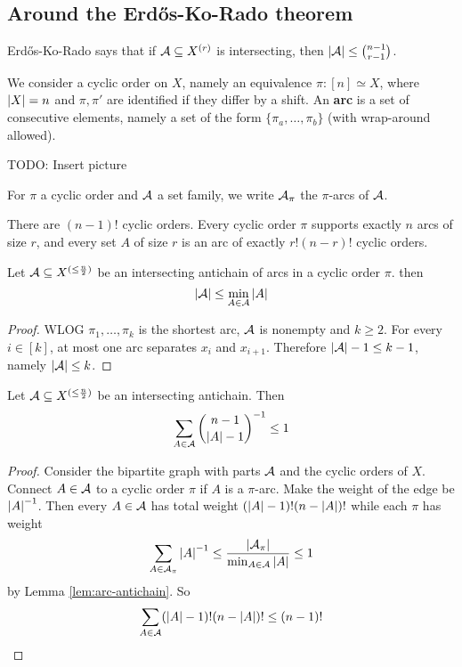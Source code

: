 \documentclass{article}
\begin{document}
\clearpage

\subsection{Around the Erd\H os-Ko-Rado theorem}

Erd\H os-Ko-Rado says that if $\mathcal A \subseteq X^{(r)}$ is intersecting, then $\left\lvert \mathcal A\right\rvert \le \binom{n - 1}{r - 1}$.

\newlec

\begin{defi}
  We consider a cyclic order on $X$, namely an equivalence $\pi : [n] \simeq X$, where $\left\lvert X\right\rvert = n$ and $\pi, \pi'$ are identified if they differ by a shift. An {\bf arc} is a set of consecutive elements, namely a set of the form $\{\pi_a, \dots, \pi_b\}$ (with wrap-around allowed).
  
  TODO: Insert picture
  
  For $\pi$ a cyclic order and $\mathcal A$ a set family, we write $\mathcal A_\pi$ the $\pi$-arcs of $\mathcal A$.

  There are $(n - 1)!$ cyclic orders. Every cyclic order $\pi$ supports exactly $n$ arcs of size $r$, and every set $A$ of size $r$ is an arc of exactly $r!(n - r)!$ cyclic orders.
\end{defi}

\begin{nlemma}\label{lem:arc-antichain}
  Let $\mathcal A \subseteq X^{(\le \frac n2)}$ be an intersecting antichain of arcs in a cyclic order $\pi$. then
  $$\left\lvert \mathcal A\right\rvert \le \min_{A \in \mathcal A} \left\lvert A\right\rvert$$
\end{nlemma}
\begin{proof}
  WLOG $\pi_1, \dots, \pi_k$ is the shortest arc, $\mathcal A$ is nonempty and $k \ge 2$. For every $i \in [k]$, at most one arc separates $x_i$ and $x_{i + 1}$. Therefore $\left\lvert \mathcal A\right\rvert - 1 \le k - 1$, namely $\left\lvert \mathcal A\right\rvert \le k$.
\end{proof}

\begin{nthm}
  Let $\mathcal A \subseteq X^{(\le \frac n2)}$ be an intersecting antichain. Then
  $$\sum_{A \in \mathcal A} \binom{n - 1}{\left\lvert A\right\rvert - 1}^{-1} \le 1$$
\end{nthm}
\begin{proof}
  Consider the bipartite graph with parts $\mathcal A$ and the cyclic orders of $X$. Connect $A \in \mathcal A$ to a cyclic order $\pi$ if $A$ is a $\pi$-arc. Make the weight of the edge be $\left\lvert A\right\rvert^{-1}$. Then every $A \in \mathcal A$ has total weight $(\left\lvert A\right\rvert - 1)!(n - \left\lvert A\right\rvert)!$ while each $\pi$ has weight
  $$\sum_{A \in \mathcal A_\pi} \left\lvert A\right\rvert^{-1} \le \frac{\left\lvert \mathcal A_\pi\right\rvert}{\min_{A \in \mathcal A} \left\lvert A\right\rvert} \le 1$$
  by Lemma \ref{lem:arc-antichain}. So
  $$\sum_{A \in \mathcal A} (\left\lvert A\right\rvert - 1)!(n - \left\lvert A\right\rvert)! \le (n - 1)!$$
\end{proof}
\end{document}
